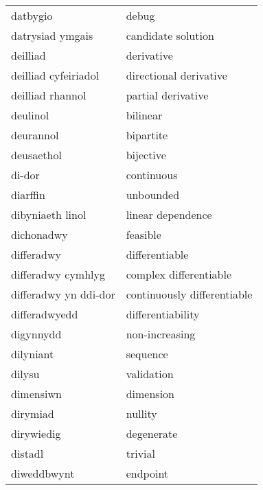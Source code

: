\begin{supertabular}{p{0.22\textwidth}p{0.22\textwidth}}
                       datbygio &                            debug \\
               datrysiad ymgais &               candidate solution \\
                       deilliad &                       derivative \\
           deilliad cyfeiriadol &           directional derivative \\
               deilliad rhannol &               partial derivative \\
                       deulinol &                         bilinear \\
                      deurannol &                        bipartite \\
                     deusaethol &                        bijective \\
                         di-dor &                       continuous \\
                       diarffin &                        unbounded \\
               dibyniaeth linol &                linear dependence \\
                     dichonadwy &                         feasible \\
                     differadwy &                   differentiable \\
             differadwy cymhlyg &           complex differentiable \\
          differadwy yn ddi-dor &      continuously differentiable \\
                  differadwyedd &                differentiability \\
                      digynnydd &                   non-increasing \\
                      dilyniant &                         sequence \\
                         dilysu &                       validation \\
                      dimensiwn &                        dimension \\
                       dirymiad &                          nullity \\
                     dirywiedig &                       degenerate \\
                        distadl &                          trivial \\
                    diweddbwynt &                         endpoint \\

\end{supertabular}
